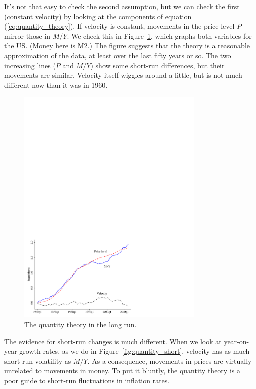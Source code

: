 It's not that easy to check the second assumption, but we can
check the first (constant velocity) by looking at the components of
equation (\ref{eq:quantity_theory}).
If velocity is constant, movements in the price
level $P$ mirror those in $M/Y$.
We check this in Figure~\ref{fig:quantity_long}, which graphs
both variables for the US.
(Money here is \href{http://research.stlouisfed.org/fred2/series/M2}{M2}.)
The figure suggests that the theory is a reasonable approximation of the data, at least
over the last fifty years or so.
The two increasing lines ($P$ and $M/Y$)
show some short-run differences, but their movements are similar.
Velocity itself wiggles around a little, but is not
much different now than it was in 1960.
%
\begin{figure}[h]
    \caption{The quantity theory in the long run.}
    \label{fig:quantity_long}
    \centering
    \includegraphics[width=0.8\textwidth]{Figures/long.pdf}
\end{figure}
%

The evidence for short-run changes is much different.
When we look at year-on-year growth rates,
as we do in Figure~\ref{fig:quantity_short},
velocity has as much short-run volatility as $M/Y$.
As a consequence,
movements in prices are virtually unrelated to movements in money.
To put it bluntly, the quantity theory is a poor guide to short-run fluctuations
in inflation rates.

